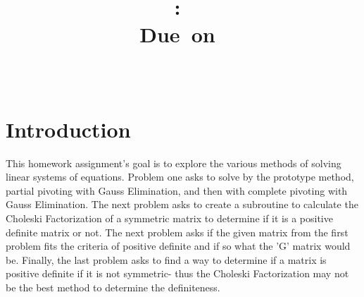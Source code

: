\documentclass{article}
\title{
\vspace{2in}
\textmd{\textbf{\hmwkClass:\ \hmwkTitle}}\\
\normalsize\vspace{0.1in}\small{Due\ on\ \hmwkDueDate}\\
\vspace{0.1in}\large{\textit{\hmwkClassInstructor\ \hmwkClassTime}}
\vspace{3in}
}
\author{\textbf{\hmwkAuthorName}}
\date{} %
\begin{document}
\maketitle



\newpage
\tableofcontents
\newpage
\section{Introduction}
This homework assignment's goal is to explore the various methods of solving linear systems of equations. Problem one asks to solve by the prototype method, partial pivoting with Gauss Elimination, and then with complete pivoting with Gauss Elimination. The next problem asks to create a subroutine to calculate the Choleski Factorization of a symmetric matrix to determine if it is a positive definite matrix or not. The next problem asks if the given matrix from the first problem fits the criteria of positive definite and if so what the 'G' matrix would be. Finally, the last problem asks to find a way to determine if a matrix is positive definite if it is not symmetric- thus the Choleski Factorization may not be the best method to determine the definiteness.

\end{document}
